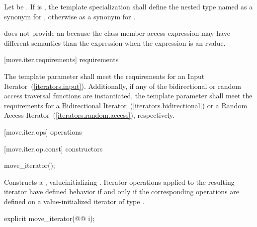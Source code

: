 \begin{addedblock}
\pnum
Let  be . If 
is , the template specialization  shall define the nested
type named  as a synonym for , otherwise
as a synonym for .

\pnum
\enternote {} does not provide an  because the class member access
expression  may have different semantics than the expression
 when the expression  is an rvalue.\exitnote
\end{addedblock}

\begin{removedblock}
[move.iter.requirements]{ requirements}

\pnum
The template parameter  shall meet
the requirements for an Input Iterator~(\ref{iterators.input}).
Additionally, if any of the bidirectional or random access traversal
functions are instantiated, the template parameter shall meet the
requirements for a Bidirectional Iterator~(\ref{iterators.bidirectional})
or a Random Access Iterator~(\ref{iterators.random.access}), respectively.
\end{removedblock}

[move.iter.ops]{ operations}

[move.iter.op.const]{ constructors}

%
\begin{itemdecl}
move_iterator();
\end{itemdecl}

\begin{itemdescr}
\pnum
\effects Constructs a , value\added{-}initializing
. Iterator operations applied to the resulting
iterator have defined behavior if and only if the corresponding operations are defined
on a value-initialized iterator of type .
\end{itemdescr}


%
\begin{itemdecl}
explicit move_iterator(@@ i);
\end{itemdecl}


